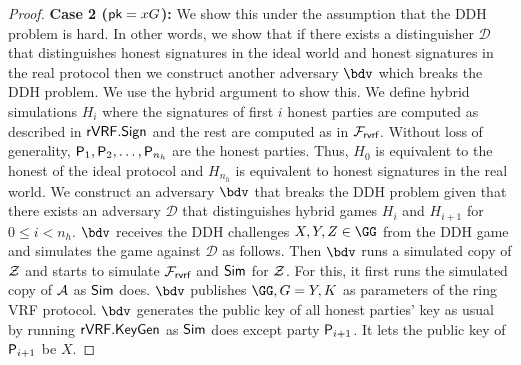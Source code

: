 \begin{proof}
	\textbf{Case 2 ($ \mathsf{pk} = x G$):} We  show this under the assumption that the DDH problem  is hard.  In other words, we show that if there exists a distinguisher $ \mathcal{D} $ that distinguishes honest signatures in the ideal world and honest signatures in the real protocol then we construct another adversary $ \bdv $ which breaks the DDH problem. 
	We use the hybrid argument to show this.
	We define hybrid simulations $ H_{i} $ where  the signatures of first $ i $ honest parties are computed as described in $ {\mathsf{rVRF}}.{\mathsf{Sign}} $ and the rest are computed as in $ \mathcal{F}_{\textsf{rvrf}} $. Without loss of generality, $ \mathsf{P}_1, \mathsf{P}_2, \ldots, \mathsf{P}_{n_h} $ are the honest parties. Thus, $ H_0 $ is equivalent to the honest of the ideal protocol  and $ H_{n_h}  $ is equivalent to  honest signatures in the real world.  We construct an adversary $ \bdv $ that breaks the DDH problem given that there exists an adversary $ \mathcal{D} $ that distinguishes hybrid games $ H_i $ and $ H_{i + 1} $ for $ 0 \leq i < n_h $. $\bdv $ receives the DDH challenges $ X,Y, Z \in \GG $ from the DDH game and simulates the game against $ \mathcal{D} $ as follows. 
	Then $ \bdv $ runs a simulated copy of $ \mathcal{Z} $ and starts to simulate $ \mathcal{F}_{\textsf{rvrf}} $ and $ \mathsf{Sim} $ for $ \mathcal{Z} $. For this, it first runs the simulated copy of $ \mathcal{A} $ as $ \mathsf{Sim} $ does. $  \bdv $ publishes $ \GG, \genG = Y, \genB $ as parameters of the ring VRF protocol. $\bdv $ generates the public key of all  honest parties' key as usual by running $ {\mathsf{rVRF}}.{\mathsf{KeyGen}}$ as $ \mathsf{Sim} $ does except party $ \mathsf{P}_{i+1} $. It lets the public key of $ \mathsf{P}_{i + 1} $ be $ X $.
	
	

\end{proof}
